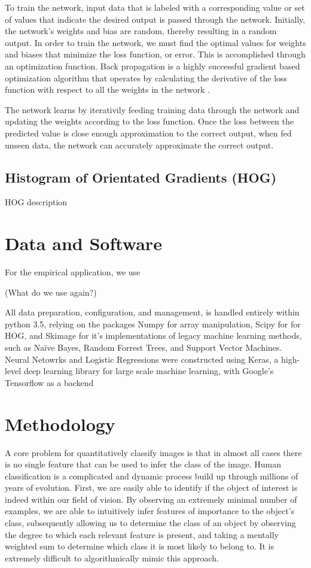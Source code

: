\documentclass{article}
\begin{document}
To train the network, input data that is labeled with a corresponding value or set of values that indicate the desired output is passed through the network. Initially, the network's weights and bias are random, thereby resulting in a random output. In order to train the network, we must find the optimal values for weights and biases that minimize the loss function, or error. This is accomplished through an optimization function. Back propagation is a highly successful gradient based optimization algorithm that operates by calculating the derivative of the loss function with respect to all the weights in the network \cite{LSTM2}.


The network learns by iterativily feeding training data through the network and updating the weights according to the loss function. Once the loss between the predicted value is close enough approximation to the correct output, when fed unseen data, the network can accurately approximate the correct output. 

\subsection{\label{sec:level2}Histogram of Orientated Gradients (HOG)}

HOG description

\section{Data and Software}

For the empirical application, we use 

(What do we use again?)

All data preparation, configuration, and management, is handled entirely within python 3.5, relying on the packages Numpy for array manipulation, Scipy for for HOG, and Skimage for it's implementations of legacy machine learning methods, such as Naïve Bayes, Random Forrest Trees, and Support Vector Machines. Neural Netowrks and Logistic Regressions were constructed using Keras, a high-level deep learning library for large scale machine learning, with Google's Tensorflow as a backend  

\section{Methodology} 
 

A core problem for quantitatively classify images is that in almost all cases there is no single feature that can be used to infer the class of the image. Human classification is a complicated and dynamic process build up through millions of years of evolution. First, we are easily able to identify if the object of interest is indeed within our field of vision. By observing an extremely minimal number of examples, we are able to intuitively infer features of importance to the object's class, subsequently allowing us to determine the class of an object by observing the degree to which each relevant feature is present, and taking a mentally weighted sum to determine which class it is most likely to belong to. It is extremely difficult to algorithmically mimic this approach.
\end{document}
